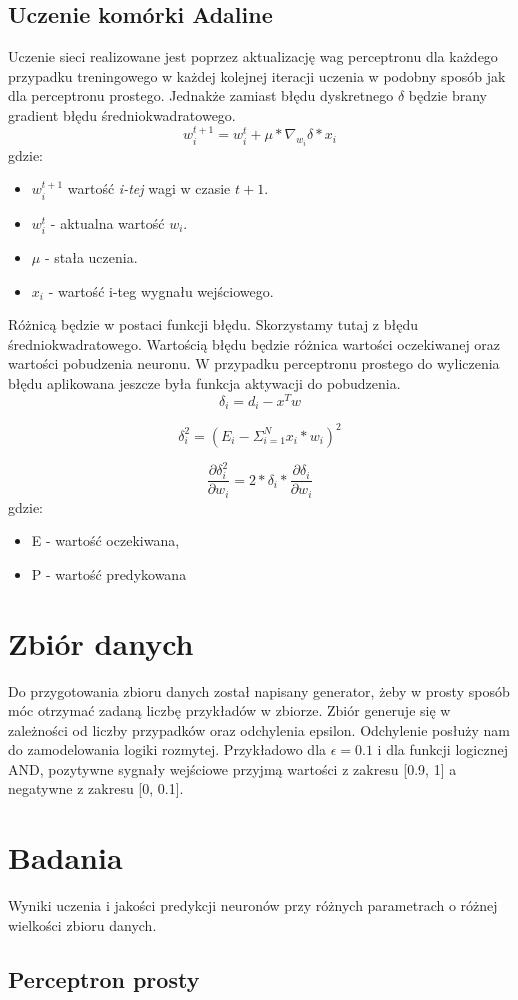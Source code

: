 \documentclass{article}
\begin{document}
    \subsection{Uczenie komórki Adaline}
    Uczenie sieci realizowane jest poprzez aktualizację wag perceptronu dla każdego przypadku treningowego w każdej kolejnej iteracji uczenia w podobny sposób jak dla perceptronu prostego. Jednakże zamiast błędu dyskretnego $\delta$ będzie brany gradient błędu średniokwadratowego.
    \begin{equation}
    w_i^{t+1} = w_i^t + \mu * \nabla_{w_i} \delta * x_i
    \end{equation}
    gdzie:
    \begin{itemize}
        \item $w_i^{t+1}$ wartość \textit{i-tej} wagi w czasie $t+1$.
        \item $w_i^t$ - aktualna wartość $w_i$.
        \item $\mu$ - stała uczenia.
        \item $x_i$ - wartość i-teg wygnału wejściowego.
    \end{itemize}
    Różnicą będzie w postaci funkcji błędu. Skorzystamy tutaj z błędu średniokwadratowego. Wartością błędu będzie różnica wartości oczekiwanej oraz wartości pobudzenia neuronu. W przypadku perceptronu prostego do wyliczenia błędu aplikowana jeszcze była funkcja aktywacji do pobudzenia.
    \begin{equation}
    \delta_i = d_i - x^Tw 
    \end{equation}
    
    \begin{equation}
     \delta_i^2 = (E_i - \Sigma_{i=1}^{N} x_i*w_i )^2 
     \end{equation}
     
     \begin{equation}
     \frac{\partial \delta_i^2}{\partial w_i} = 2 * \delta_i * \frac{\partial \delta_i}{\partial w_i}
     \end{equation}
    gdzie:
    \begin{itemize}
    	\item E - wartość oczekiwana,
    	\item P - wartość predykowana
    \end{itemize}
    
	\newpage
	\section{Zbiór danych}
	Do przygotowania zbioru danych został napisany generator, żeby w prosty sposób móc otrzymać zadaną liczbę przykładów w zbiorze. Zbiór generuje się w zależności od liczby przypadków oraz odchylenia epsilon. Odchylenie posłuży nam do zamodelowania logiki rozmytej. Przykładowo dla $\epsilon = 0.1$ i dla funkcji logicznej AND, pozytywne sygnały wejściowe przyjmą wartości z zakresu [0.9, 1] a negatywne z zakresu [0, 0.1].
	
	\section{Badania}
	Wyniki uczenia i jakości predykcji neuronów przy różnych parametrach o różnej wielkości zbioru danych.
	\subsection{Perceptron prosty}
\end{document}
